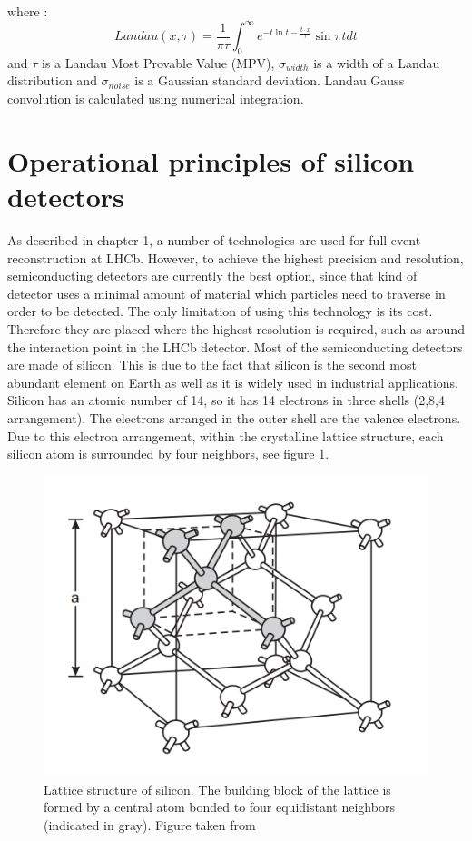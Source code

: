 where :
\begin{equation}
    Landau(x,\tau) =  \frac{1}{\pi \tau} \int_{0}^{\infty} e^{-t \ln t - \frac{t \cdot x}{\tau}} \sin{\pi t} dt
\end{equation}
and $\tau$ is a Landau Most Provable Value (MPV), $\sigma_{width}$ is a width of a Landau distribution and $\sigma_{noise}$ is a Gaussian standard deviation. Landau Gauss convolution is calculated using numerical integration. 


\section{Operational principles of silicon detectors}

As described in chapter 1, a number of technologies are used for full event reconstruction at LHCb.  However, to achieve the highest precision and resolution, semiconducting detectors are currently the best option, since that kind of detector uses a minimal amount of material which particles need to traverse in order to be detected.  The only limitation of using this technology is its cost. Therefore they are placed where the highest resolution is required, such as around the interaction point in the LHCb detector. 
Most of the semiconducting detectors are made of silicon.  This is due to the fact that silicon is the second most abundant element on Earth as well as it is widely used in industrial applications. Silicon has an atomic number of 14, so it has 14 electrons in three shells (2,8,4 arrangement). The electrons arranged in the outer shell are the valence electrons.  Due to this electron arrangement, within the crystalline lattice structure, each silicon atom is surrounded by four neighbors, see figure \ref{fig:silicon}.  

\begin{figure}[h]
\centering
\includegraphics{figures/silicon.PNG}
\caption{Lattice structure of silicon. The building block of the lattice is formed by a central atom bonded to four
equidistant neighbors (indicated in gray). Figure taken from \cite{semiconductors_det_sys}}
\label{fig:silicon}
\end{figure}




